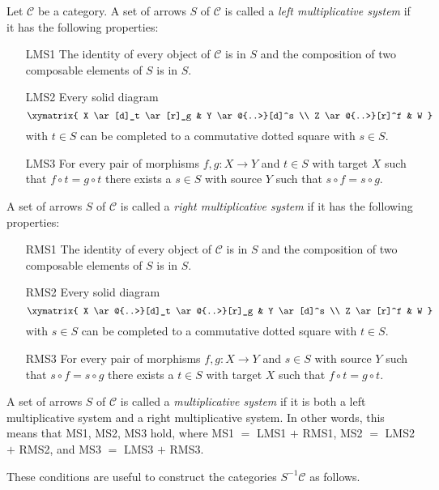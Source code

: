 \begin{definition}
\label{definition-multiplicative-system}
Let $\mathcal{C}$ be a category. A set of arrows $S$ of $\mathcal{C}$ is
called a {\it left multiplicative system} if it has the following properties:
\begin{enumerate}
\item[LMS1] The identity of every object of $\mathcal{C}$ is in $S$ and
the composition of two composable elements of $S$ is in $S$.
\item[LMS2] Every solid diagram
$$
\xymatrix{
X \ar[d]_t \ar[r]_g & Y \ar@{..>}[d]^s \\
Z \ar@{..>}[r]^f & W
}
$$
with $t \in S$ can be completed to a commutative dotted square with
$s \in S$.
\item[LMS3] For every pair of morphisms $f, g : X \to Y$ and
$t \in S$ with target $X$ such that $f \circ t = g \circ t$
there exists a $s \in S$ with source $Y$ such that
$s \circ f = s \circ g$.
\end{enumerate}
A set of arrows $S$ of $\mathcal{C}$ is
called a {\it right multiplicative system}
if it has the following properties:
\begin{enumerate}
\item[RMS1] The identity of every object of $\mathcal{C}$ is in $S$ and
the composition of two composable elements of $S$ is in $S$.
\item[RMS2] Every solid diagram
$$
\xymatrix{
X \ar@{..>}[d]_t \ar@{..>}[r]_g & Y \ar[d]^s \\
Z \ar[r]^f & W
}
$$
with $s \in S$ can be completed to a commutative dotted square with
$t \in S$.
\item[RMS3] For every pair of morphisms $f, g : X \to Y$ and
$s \in S$ with source $Y$ such that $s \circ f = s \circ g$
there exists a $t \in S$ with target $X$ such that
$f \circ t = g \circ t$.
\end{enumerate}
A set of arrows $S$ of $\mathcal{C}$ is called a {\it multiplicative system}
if it is both a left multiplicative system and a right multiplicative system.
In other words, this means that MS1, MS2, MS3 hold, where
MS1 $=$ LMS1 $+$ RMS1, MS2 $=$ LMS2 $+$ RMS2, and
MS3 $=$ LMS3 $+$ RMS3.
\end{definition}

\noindent
These conditions are useful to construct the categories $S^{-1}\mathcal{C}$
as follows.

